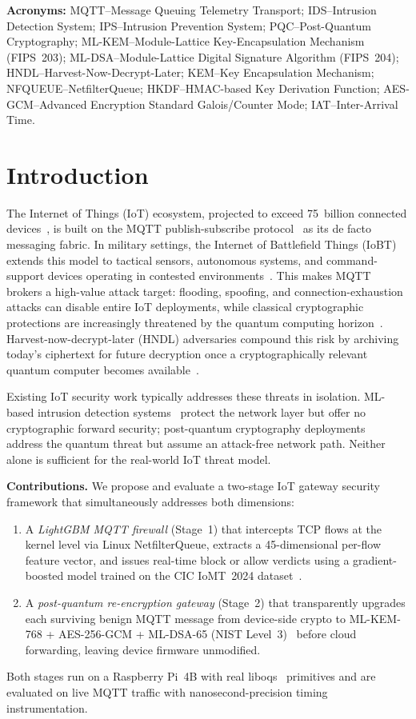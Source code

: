 \documentclass[conference]{IEEEtran}
\begin{document}
\noindent\textbf{Acronyms:} MQTT--Message Queuing Telemetry Transport; IDS--Intrusion Detection System; IPS--Intrusion Prevention System; PQC--Post-Quantum Cryptography; ML-KEM--Module-Lattice Key-Encapsulation Mechanism (FIPS~203); ML-DSA--Module-Lattice Digital Signature Algorithm (FIPS~204); HNDL--Harvest-Now-Decrypt-Later; KEM--Key Encapsulation Mechanism; NFQUEUE--NetfilterQueue; HKDF--HMAC-based Key Derivation Function; AES-GCM--Advanced Encryption Standard Galois/Counter Mode; IAT--Inter-Arrival Time.

\section{Introduction}

The Internet of Things (IoT) ecosystem, projected to exceed 75~billion connected devices~\cite{statista2024}, is built on the MQTT publish-subscribe protocol~\cite{mqtt_oasis} as its de facto messaging fabric. In military settings, the Internet of Battlefield Things (IoBT) extends this model to tactical sensors, autonomous systems, and command-support devices operating in contested environments~\cite{kott2016iobt}. This makes MQTT brokers a high-value attack target: flooding, spoofing, and connection-exhaustion attacks can disable entire IoT deployments, while classical cryptographic protections are increasingly threatened by the quantum computing horizon~\cite{shor1994}. Harvest-now-decrypt-later (HNDL) adversaries compound this risk by archiving today's ciphertext for future decryption once a cryptographically relevant quantum computer becomes available~\cite{mosca2018}.

Existing IoT security work typically addresses these threats in isolation. ML-based intrusion detection systems~\cite{iot_ids_survey, mqtt_ids_ml} protect the network layer but offer no cryptographic forward security; post-quantum cryptography deployments~\cite{pqc_iot_survey} address the quantum threat but assume an attack-free network path. Neither alone is sufficient for the real-world IoT threat model.

\textbf{Contributions.} We propose and evaluate a two-stage IoT gateway security framework that simultaneously addresses both dimensions:
\begin{enumerate}
  \item A \textit{LightGBM MQTT firewall} (Stage~1) that intercepts TCP flows at the kernel level via Linux NetfilterQueue, extracts a 45-dimensional per-flow feature vector, and issues real-time block or allow verdicts using a gradient-boosted model trained on the CIC IoMT~2024 dataset~\cite{ciciomt2024}.
  \item A \textit{post-quantum re-encryption gateway} (Stage~2) that transparently upgrades each surviving benign MQTT message from device-side crypto to ML-KEM-768 + AES-256-GCM + ML-DSA-65 (NIST Level~3)~\cite{nist_fips203, nist_fips204} before cloud forwarding, leaving device firmware unmodified.
\end{enumerate}
Both stages run on a Raspberry Pi~4B with real liboqs~\cite{oqs2023} primitives and are evaluated on live MQTT traffic with nanosecond-precision timing instrumentation.
\end{document}
